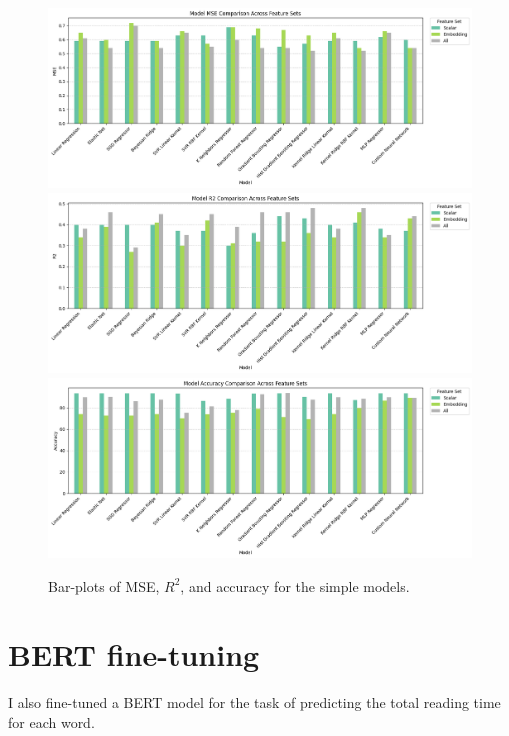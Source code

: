 \begin{figure}
    \centering
    \includegraphics[width=1\linewidth]{images/mse_barplot.png}\hfill
    \includegraphics[width=1\linewidth]{images/r2_barplot.png}\hfill
    \includegraphics[width=1\linewidth]{images/accuracy_barplot.png}
    \caption{Bar-plots of MSE, $R^2$, and accuracy for the simple models.}
    \label{fig:simple_models_barplots}
\end{figure}


\section{BERT fine-tuning}
I also fine-tuned a BERT model for the task of predicting the total reading time for each word.


